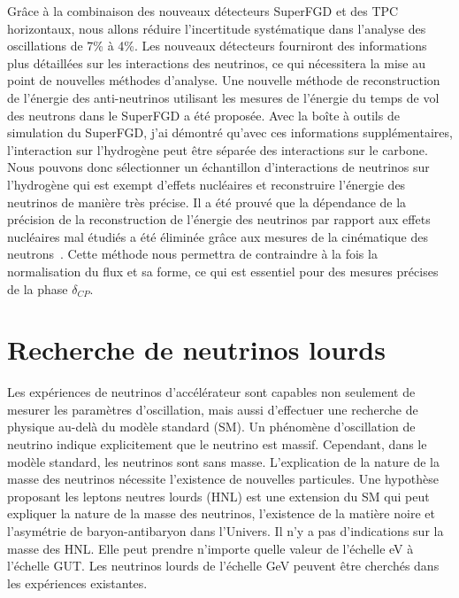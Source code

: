 \documentclass[../main.tex]{subfiles}
\begin{document}
Grâce à la combinaison des nouveaux détecteurs SuperFGD et des TPC horizontaux, nous allons réduire l'incertitude systématique dans l'analyse des oscillations de 7\% à 4\%. Les nouveaux détecteurs fourniront des informations plus détaillées sur les interactions des neutrinos, ce qui nécessitera la mise au point de nouvelles méthodes d'analyse. Une nouvelle méthode de reconstruction de l'énergie des anti-neutrinos utilisant les mesures de l'énergie du temps de vol des neutrons dans le SuperFGD a été proposée. Avec la boîte à outils de simulation du SuperFGD, j'ai démontré qu'avec ces informations supplémentaires, l'interaction sur l'hydrogène peut être séparée des interactions sur le carbone. Nous pouvons donc sélectionner un échantillon d'interactions de neutrinos sur l'hydrogène qui est exempt d'effets nucléaires et reconstruire l'énergie des neutrinos de manière très précise. Il a été prouvé que la dépendance de la précision de la reconstruction de l'énergie des neutrinos par rapport aux effets nucléaires mal étudiés a été éliminée grâce aux mesures de la cinématique des neutrons~\cite{Munteanu2019}. Cette méthode nous permettra de contraindre à la fois la normalisation du flux et sa forme, ce qui est essentiel pour des mesures précises de la phase $\delta_{CP}$.

\vspace{1cm}

\setcounter{section}{2}
\section*{Recherche de neutrinos lourds}

Les expériences de neutrinos d'accélérateur sont capables non seulement de mesurer les paramètres d'oscillation, mais aussi d'effectuer une recherche de physique au-delà du modèle standard (SM). Un phénomène d'oscillation de neutrino indique explicitement que le neutrino est massif. Cependant, dans le modèle standard, les neutrinos sont sans masse. L'explication de la nature de la masse des neutrinos nécessite l'existence de nouvelles particules. Une hypothèse proposant les leptons neutres lourds (HNL) est une extension du SM qui peut expliquer la nature de la masse des neutrinos, l'existence de la matière noire et l'asymétrie de baryon-antibaryon dans l'Univers. Il n'y a pas d'indications sur la masse des HNL. Elle peut prendre n'importe quelle valeur de l'échelle eV à l'échelle GUT. Les neutrinos lourds de l'échelle GeV peuvent être cherchés dans les expériences existantes.
\end{document}
